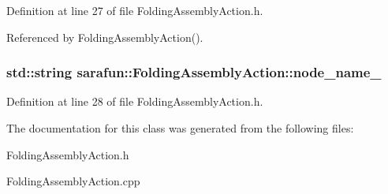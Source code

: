 Definition at line 27 of file Folding\-Assembly\-Action.\-h.



Referenced by Folding\-Assembly\-Action().

\hypertarget{classsarafun_1_1FoldingAssemblyAction_a80098bc35b0c446a61b0e84f4e97c8ab_a80098bc35b0c446a61b0e84f4e97c8ab}{
\subsubsection[{node\-\_\-name\-\_\-}]{\setlength{\rightskip}{0pt plus 5cm}std\-::string sarafun\-::\-Folding\-Assembly\-Action\-::node\-\_\-name\-\_\-\hspace{0.3cm}{\ttfamily [private]}}}\label{classsarafun_1_1FoldingAssemblyAction_a80098bc35b0c446a61b0e84f4e97c8ab_a80098bc35b0c446a61b0e84f4e97c8ab}


Definition at line 28 of file Folding\-Assembly\-Action.\-h.



The documentation for this class was generated from the following files\-:\begin{DoxyCompactItemize}
\item 
Folding\-Assembly\-Action.\-h\item 
Folding\-Assembly\-Action.\-cpp\end{DoxyCompactItemize}
